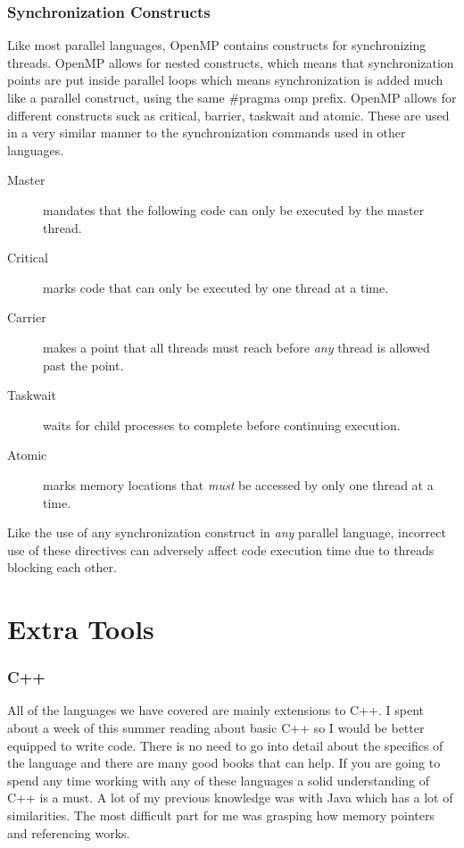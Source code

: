 \documentclass{article}
\newcommand{\comp}[1]{{\ttfamily #1}}
\begin{document}
    \section{Synchronization Constructs}
    Like most parallel languages, OpenMP contains constructs for synchronizing threads. OpenMP allows for nested constructs, which means that synchronization points are put inside parallel loops which means synchronization is added much like a parallel construct, using the same \comp{\#pragma omp} prefix. OpenMP allows for different constructs suck as \comp{critical}, \comp{barrier}, \comp{taskwait} and \comp{atomic}. These are used in a very similar manner to the synchronization commands used in other languages.
    
    \begin{description}
    	\item[Master] mandates that the following code can only be executed by the master thread.
    	\item[Critical] marks code that can only be executed by one thread at a time.
    	\item[Carrier] makes a point that all threads must reach before \emph{any} thread is allowed past the point.
    	\item[Taskwait] waits for child processes to complete before continuing execution.
    	\item[Atomic] marks memory locations that \emph{must} be accessed by only one thread at a time.
    \end{description}
    
    Like the use of any synchronization construct in \emph{any} parallel language, incorrect use of these directives can adversely affect code execution time due to threads blocking each other.   

\part{Extra Tools}
  \section{C++}
  All of the languages we have covered are mainly extensions to C++. I spent about a week of this summer reading about basic C++ so I would be better equipped to write code. There is no need to go into detail about the specifics of the language and there are many good books that can help. If you are going to spend any time working with any of these languages a solid understanding of C++ is a must. A lot of my previous knowledge was with Java which has a lot of similarities. The most difficult part for me was grasping how memory pointers and referencing works.
\end{document}
